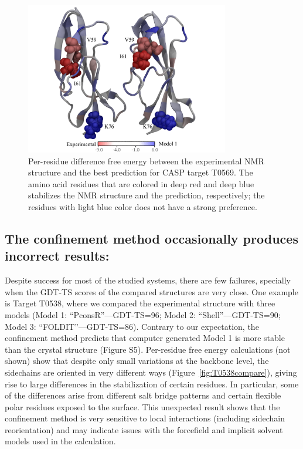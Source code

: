 \documentclass[12pt]{article}
\begin{document}
\begin{figure}
    \begin{center}
        \includegraphics[width=3.5in]{T0569_perres1.pdf}
    \end{center}
    \caption{Per-residue difference free energy between the experimental NMR structure and the best prediction for CASP
        target T0569. The amino acid residues that are colored in deep red and deep blue stabilizes the NMR structure
        and the prediction, respectively; the residues with light blue color does not have a strong preference.}
\label{fig:T0569_per_residue}
\end{figure}

\subsection*{The confinement method occasionally produces incorrect results:}

Despite success for most of the studied systems, there are few failures, specially when the GDT-TS scores of the
compared structures are very close. One example is Target T0538, where we compared the experimental structure with three
models (Model 1: ``PconsR''---GDT-TS=96; Model 2: ``Shell''---GDT-TS=90; Model 3: ``FOLDIT''---GDT-TS=86). Contrary to
our expectation, the confinement method predicts that computer generated Model 1 is more stable than the crystal structure (Figure S5).
Per-residue free energy calculations (not shown) show that despite only small variations at the backbone level, the
sidechains are oriented in very different ways (Figure~\ref{fig:T0538compare}), giving rise to large differences in the stabilization of
certain residues. In particular, some of the differences arise from different salt bridge patterns and certain flexible
polar residues exposed to the surface. This unexpected result shows that the confinement method is very sensitive to
local interactions (including sidechain reorientation) and may indicate issues with the forcefield and implicit solvent
models used in the calculation.
\end{document}
